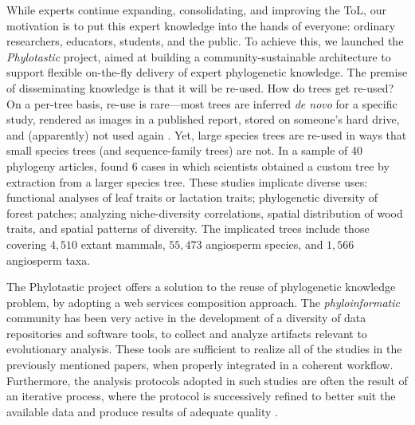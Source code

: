 \documentclass{new_tlp}
\begin{document}
While experts continue expanding, consolidating, and improving the ToL, our motivation is to put this
expert knowledge into the hands of everyone: ordinary researchers, educators, students, and the public.
To achieve this, we launched the \emph{Phylotastic} project, aimed at building a community-sustainable architecture to support
flexible on-the-fly delivery of expert phylogenetic knowledge.
The premise of disseminating knowledge is that it will be re-used. How do trees get re-used? On a
per-tree basis, re-use is rare---most trees are inferred \emph{de novo} for a specific study, rendered as
images in a published report, stored on someone's hard drive, and (apparently) not used again \cite{ph3}.
Yet, large species trees are re-used in ways that small species trees (and sequence-family trees)
are not. In a sample of 40 phylogeny articles,  found 6 cases in which scientists
obtained a custom tree by extraction from a larger species tree. These studies implicate diverse
uses: functional analyses of leaf traits or lactation traits; phylogenetic
diversity of forest patches; analyzing niche-diversity correlations, spatial distribution of wood
traits, and spatial patterns of diversity. The implicated trees include those covering $4,510$
extant mammals, $55,473$ angiosperm species, and $1,566$ angiosperm taxa.

The Phylotastic project offers a solution to  the reuse of phylogenetic knowledge problem, by adopting a web services
composition approach. The \emph{phyloinformatic} community has been very active in the development of a diversity
of data repositories and software tools, to collect and analyze artifacts relevant to evolutionary analysis. These
tools are sufficient to realize all of the studies in the previously
mentioned papers, when properly integrated in a coherent workflow. 
Furthermore, the analysis protocols adopted in such studies are often
the result of an iterative process, where the protocol is successively refined to better suit the available
data and produce results of adequate quality \cite{ph3}.
\end{document}
